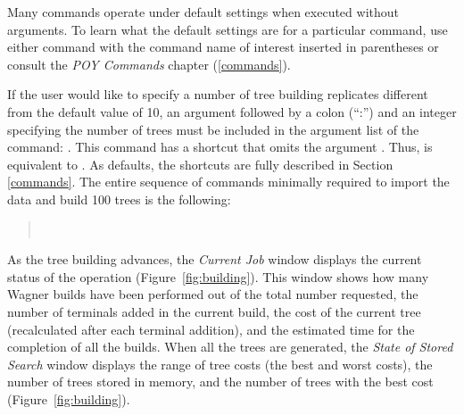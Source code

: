{Many \poy commands operate under default settings when executed without arguments. To learn what the default settings are for a particular command, use either  command with the command name of interest inserted in parentheses or consult the \emph{POY Commands} chapter (\ref{commands}).

If the user would like to specify a number of tree building replicates different from the default value of 10, an argument  followed by a colon (``:'') and an integer specifying the number of trees must be included in the argument list of the  command: . This command has a shortcut that omits the argument . Thus,  is equivalent to . As defaults, the shortcuts are fully described in Section \ref{commands}. The entire sequence of commands minimally required to import the data and build 100 trees is the following:

\begin{quote}
 	\\
\end{quote}

As the tree building advances, the \emph{Current Job} window displays the current status of the operation (Figure~\ref{fig:building}). This window shows how many Wagner builds have been performed out of the total number requested, the number of terminals added in the current build, the cost of the current tree (recalculated after each terminal addition), and the estimated time for the completion of all the builds. When all the trees are generated, the \emph{State of Stored Search} window displays the range of tree costs (the best and worst costs), the number of trees stored in memory, and the number of trees with the best cost (Figure~\ref{fig:building}).

}

